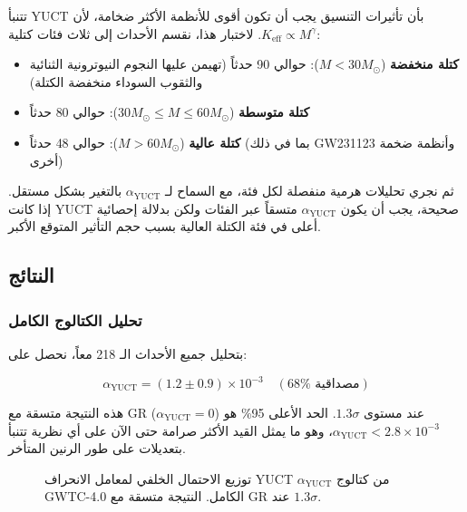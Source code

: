 \documentclass[11pt,a4paper]{article}
\theoremstyle{remark}
\newcommand{\Keff}{K_{\mathrm{eff}}}
\begin{document}
	تتنبأ YUCT بأن تأثيرات التنسيق يجب أن تكون أقوى للأنظمة الأكثر ضخامة، لأن $\Keff \propto M^{\gamma}$. لاختبار هذا، نقسم الأحداث إلى ثلاث فئات كتلية:
	
	\begin{itemize}
		\item \textbf{كتلة منخفضة} ($M < 30 M_\odot$): حوالي 90 حدثاً (تهيمن عليها النجوم النيوترونية الثنائية والثقوب السوداء منخفضة الكتلة)
		\item \textbf{كتلة متوسطة} ($30 M_\odot \le M \le 60 M_\odot$): حوالي 80 حدثاً
		\item \textbf{كتلة عالية} ($M > 60 M_\odot$): حوالي 48 حدثاً (بما في ذلك GW231123 وأنظمة ضخمة أخرى)
	\end{itemize}
	
	ثم نجري تحليلات هرمية منفصلة لكل فئة، مع السماح لـ $\alpha_{\text{YUCT}}$ بالتغير بشكل مستقل. إذا كانت YUCT صحيحة، يجب أن يكون $\alpha_{\text{YUCT}}$ متسقاً عبر الفئات ولكن بدلالة إحصائية أعلى في فئة الكتلة العالية بسبب حجم التأثير المتوقع الأكبر.
	
	\subsection{النتائج}
	
	\subsubsection{تحليل الكتالوج الكامل}
	
	بتحليل جميع الأحداث الـ 218 معاً، نحصل على:
	
	\begin{equation}
		\alpha_{\text{YUCT}} = (1.2 \pm 0.9) \times 10^{-3} \quad (68\% \text{ مصداقية})
		\label{eq:alpha-result}
	\end{equation}
	
	هذه النتيجة متسقة مع GR ($\alpha_{\text{YUCT}} = 0$) عند مستوى $1.3\sigma$. الحد الأعلى 95\% هو $\alpha_{\text{YUCT}} < 2.8 \times 10^{-3}$، وهو ما يمثل القيد الأكثر صرامة حتى الآن على أي نظرية تتنبأ بتعديلات على طور الرنين المتأخر.
	
	\begin{figure}[htbp]
		\centering
		\caption{توزيع الاحتمال الخلفي لمعامل الانحراف YUCT $\alpha_{\text{YUCT}}$ من كتالوج GWTC-4.0 الكامل. النتيجة متسقة مع GR عند $1.3\sigma$.}
		\label{fig:alpha-posterior}
	\end{figure}
	
\end{document}
